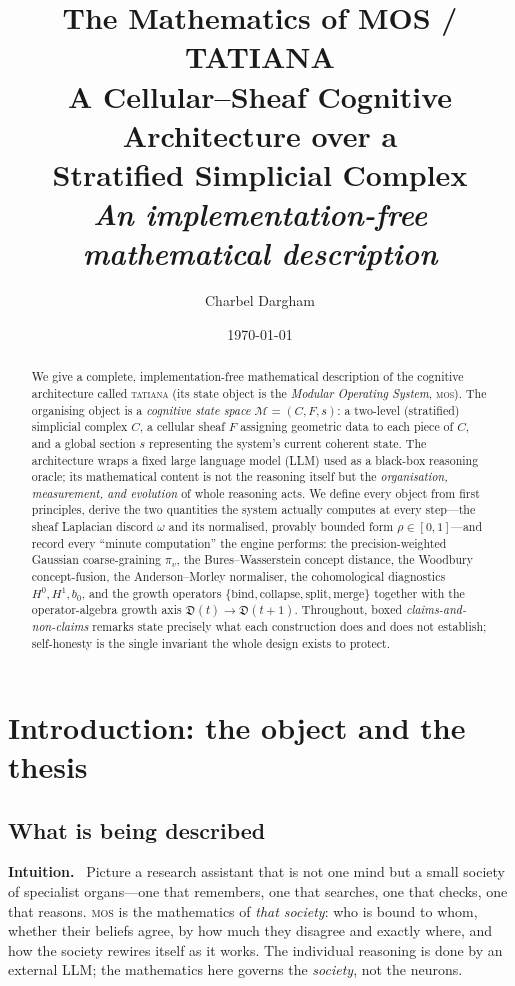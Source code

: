 \documentclass[11pt]{article}
\title{\textbf{The Mathematics of MOS / TATIANA}\\[2pt]
\large A Cellular--Sheaf Cognitive Architecture over a\\
Stratified Simplicial Complex\\[6pt]
\normalsize\emph{An implementation-free mathematical description}}
\author{Charbel Dargham}
\date{\today}
\theoremstyle{definition}
\theoremstyle{plain}
\theoremstyle{remark}
\newcommand{\Intu}{\noindent\textbf{\color{intuitioncol}Intuition.}\ }
\newcommand{\M}{\mathcal{M}}
\newcommand{\CC}{C}                 %
\newcommand{\Fs}{F}                 %
\newcommand{\Dop}{\mathfrak{D}}     %
\newcommand{\Hzero}{H^{0}}
\newcommand{\Hone}{H^{1}}
\begin{document}
\maketitle

\begin{abstract}
\noindent
We give a complete, implementation-free mathematical description of the cognitive
architecture called \textsc{tatiana} (its state object is the \emph{Modular Operating
System}, \textsc{mos}). The organising object is a \emph{cognitive state space}
$\M=(\CC,\Fs,s)$: a two-level (stratified) simplicial complex $\CC$, a cellular sheaf
$\Fs$ assigning geometric data to each piece of $\CC$, and a global section $s$
representing the system's current coherent state. The architecture wraps a fixed
large language model (LLM) used as a black-box reasoning oracle; its mathematical
content is not the reasoning itself but the \emph{organisation, measurement, and
evolution} of whole reasoning acts. We define every object from first principles,
derive the two quantities the system actually computes at every step---the sheaf
Laplacian discord $\omega$ and its normalised, provably bounded form
$\rho\in[0,1]$---and record every ``minute computation'' the engine performs: the
precision-weighted Gaussian coarse-graining $\pi_v$, the Bures--Wasserstein concept
distance, the Woodbury concept-fusion, the Anderson--Morley normaliser, the
cohomological diagnostics $\Hzero,\Hone,b_0$, and the growth operators
$\{\text{bind},\text{collapse},\text{split},\text{merge}\}$ together with the
operator-algebra growth axis $\Dop(t)\!\to\!\Dop(t+1)$. Throughout, boxed
\emph{claims-and-non-claims} remarks state precisely what each construction does and
does not establish; self-honesty is the single invariant the whole design exists to
protect.
\end{abstract}

\tableofcontents

\section{Introduction: the object and the thesis}

\subsection{What is being described}

\begin{intu}\Intu
Picture a research assistant that is not one mind but a small society of specialist
organs---one that remembers, one that searches, one that checks, one that reasons.
\textsc{mos} is the mathematics of \emph{that society}: who is bound to whom, whether
their beliefs agree, by how much they disagree and exactly where, and how the society
rewires itself as it works. The individual reasoning is done by an external LLM; the
mathematics here governs the \emph{society}, not the neurons.
\end{intu}
\end{document}
